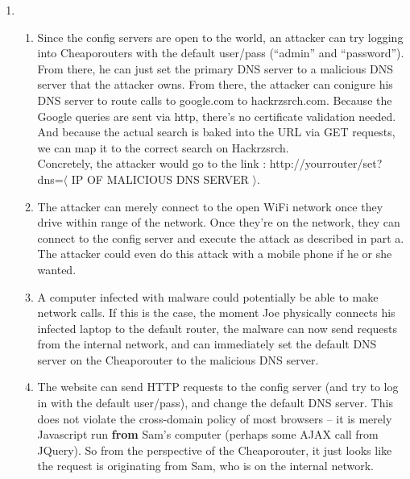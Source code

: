 
\usepackage{amsmath, dsfont, mathtools, verbatim, tikz, float, mathrsfs}

\usetikzlibrary{arrows,automata}

\oddsidemargin 0in
\evensidemargin 0in
\textwidth 6.5in
\topmargin -0.5in
\textheight 9.0in
\newcommand{\norm}[1]{\left\lVert #1 \right\rVert}
\newcommand{\?}{\stackrel{?}{=}}
\DeclarePairedDelimiter{\ceil}{\lceil}{\rceil}



\pagestyle{myheadings}

\begin{enumerate}
  \item 
    \begin{enumerate}
      \item Since the config servers are open to the world, an attacker can try logging into Cheaporouters with the default user/pass (``admin'' and ``password''). From there, he can just set the primary DNS server to a malicious DNS server that the attacker owns. From there, the attacker can conigure his DNS server to route calls to google.com to hackrzsrch.com. Because the Google queries are sent via http, there's no certificate validation needed. And because the actual search is baked into the URL via GET requests, we can map it to the correct search on Hackrzsrch.\\

        Concretely, the attacker would go to the link : http://yourrouter/set?dns=$\langle$ IP OF MALICIOUS DNS SERVER $\rangle$.
      \item The attacker can merely connect to the open WiFi network once they drive within range of the network. Once they're on the network, they can connect to the config server and execute the attack as described in part a. The attacker could even do this attack with a mobile phone if he or she wanted.
      \item A computer infected with malware could potentially be able to make network calls. If this is the case, the moment Joe physically connects his infected laptop to the default router, the malware can now send requests from the internal network, and can immediately set the default DNS server on the Cheaporouter to the malicious DNS server.
      \item The website can send HTTP requests to the config server (and try to log in with the default user/pass), and change the default DNS server. This does not violate the cross-domain policy of most browsers -- it is merely Javascript run \textbf{from} Sam's computer (perhaps some AJAX call from JQuery). So from the perspective of the Cheaporouter, it just looks like the request is originating from Sam, who is on the internal network.
    \end{enumerate}


\end{enumerate}
